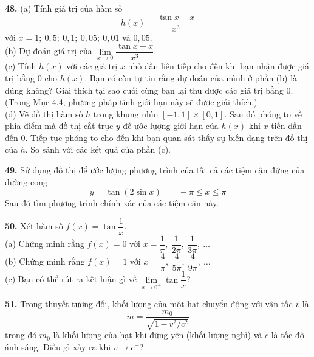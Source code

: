 \hfill
\begin{minipage}[t]{0.475\textwidth}
  \textbf{48.} (a) Tính giá trị của hàm số
  \[
    h(x) = \frac{\tan x - x}{x^3}
  \]
  với $x = 1;\ 0{,}5;\ 0{,}1;\ 0{,}05;\ 0{,}01$ và $0{,}05$.\\
  (b) Dự đoán giá trị của $\lim\limits_{x \to 0} \dfrac{\tan x - x}{x^3}$.\\[2pt]
  (c) Tính $h(x)$ với các giá trị $x$ nhỏ dần liên tiếp cho đến khi bạn nhận được giá trị bằng $0$ cho $h(x)$. Bạn có còn tự tin rằng dự đoán của mình ở phần (b) là đúng không? Giải thích tại sao cuối cùng bạn lại thu được các giá trị bằng $0$. (Trong Mục 4.4, phương pháp tính giới hạn này sẽ được giải thích.)\\[2pt]
  \llap{\graphicon\hspace{5pt}}(d) Vẽ đồ thị hàm số $h$ trong khung nhìn $[-1, 1] \times [0, 1]$. Sau đó phóng to về phía điểm mà đồ thị cắt trục $y$ để ước lượng giới hạn của $h(x)$ khi $x$ tiến dần đến $0$. Tiếp tục phóng to cho đến khi bạn quan sát thấy sự biến dạng trên đồ thị của $h$. So sánh với các kết quả của phần (c).

  \llap{\graphicon\hspace{5pt}}\textbf{49.} Sử dụng đồ thị để ước lượng phương trình của tất cả các tiệm cận đứng của đường cong
  \[
    y = \tan(2 \sin x) \qquad -\pi \leqslant x \leqslant \pi
  \]
  Sau đó tìm phương trình chính xác của các tiệm cận này.

  \textbf{50.} Xét hàm số $f(x) = \tan \dfrac{1}{x}$.\\[2pt]
  (a) Chứng minh rằng $f(x) = 0$ với $x = \dfrac{1}{\pi},\ \dfrac{1}{2\pi},\ \dfrac{1}{3\pi},\ \dots$\\[2pt]
  (b) Chứng minh rằng $f(x) = 1$ với $x = \dfrac{4}{\pi},\ \dfrac{4}{5\pi},\ \dfrac{4}{9\pi},\ \dots$\\[2pt]
  (c) Bạn có thể rút ra kết luận gì về $\lim\limits_{x \to 0^+} \tan \dfrac{1}{x}$?

  \textbf{51.} Trong thuyết tương đối, khối lượng của một hạt chuyển động với vận tốc $v$ là
  \[
    m = \frac{m_0}{\sqrt{1 - v^2/c^2}}
  \]
  trong đó $m_0$ là khối lượng của hạt khi đứng yên (khối lượng nghỉ) và $c$ là tốc độ ánh sáng. Điều gì xảy ra khi $v \to c^-$?
\end{minipage}

\vspace{2.5em}

